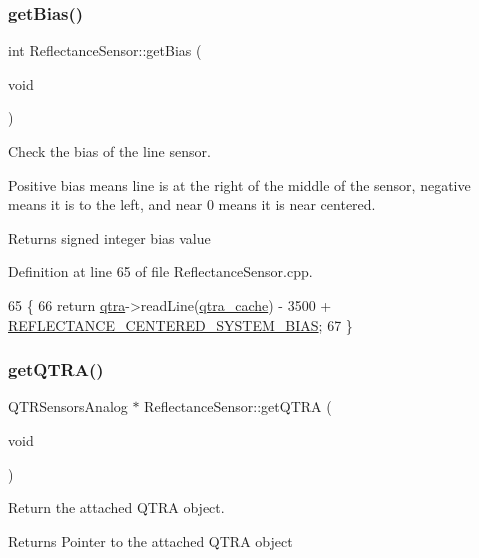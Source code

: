 \subsubsection{\texorpdfstring{get\+Bias()}{getBias()}}
{\footnotesize\ttfamily int Reflectance\+Sensor\+::get\+Bias (\begin{DoxyParamCaption}\item[{void}]{ }\end{DoxyParamCaption})}



Check the bias of the line sensor. 

Positive bias means line is at the right of the middle of the sensor, negative means it is to the left, and near 0 means it is near centered. \begin{DoxyReturn}{Returns}
signed integer bias value 
\end{DoxyReturn}


Definition at line 65 of file Reflectance\+Sensor.\+cpp.


\begin{DoxyCode}
65                                    \{
66     \textcolor{keywordflow}{return} \hyperlink{class_reflectance_sensor_a1eb0a090b619705b0234cea224400829}{qtra}->readLine(\hyperlink{class_reflectance_sensor_ab4b708129419215a57eec3b0af611542}{qtra\_cache}) - 3500 + 
      \hyperlink{config_8h_ac92cae42245af84c084405baa8a8f2b4}{REFLECTANCE\_CENTERED\_SYSTEM\_BIAS};
67 \}
\end{DoxyCode}
\mbox{\label{class_reflectance_sensor_a57665677450add1160b8fadb3699b3f6}} 
\subsubsection{\texorpdfstring{get\+Q\+T\+R\+A()}{getQTRA()}}
{\footnotesize\ttfamily Q\+T\+R\+Sensors\+Analog $\ast$ Reflectance\+Sensor\+::get\+Q\+T\+RA (\begin{DoxyParamCaption}\item[{void}]{ }\end{DoxyParamCaption})}



Return the attached Q\+T\+RA object. 

\begin{DoxyReturn}{Returns}
Pointer to the attached Q\+T\+RA object 
\end{DoxyReturn}


